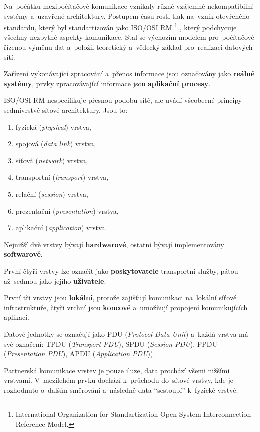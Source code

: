 Na~počátku mezipočítačové komunikace vznikaly různé vzájemně nekompatibilní systémy a~uzavřené architektury. Postupem času rostl tlak na~vznik otevřeného standardu, který byl standartizován jako ISO/OSI RM%
\footnote{International Organization for Standartization Open System Interconnection Reference Model.}%
, který podchycuje všechny nezbytné aspekty komunikace. Stal se výchozím modelem pro~počítačově řízenou výměnu dat a~položil teoretický a~vědecký základ pro~realizaci datových sítí.

Zařízení vykonávající zpracování a~přenos informace jsou označovány jako \textbf{reálné systémy}, prvky zpracovávající informace jsou \textbf{aplikační procesy}.

ISO/OSI RM nespecifikuje přesnou podobu sítě, ale uvádí všeobecné principy sedmivrstvé síťové architektury. Jsou to:

\begin{enumerate}
	\item fyzická (\emph{physical}) vrstva,
	\item spojová (\emph{data link}) vrstva,
	\item síťová (\emph{network}) vrstva,
	\item transportní (\emph{transport}) vrstva,
	\item relační (\emph{session}) vrstva,
	\item prezentační (\emph{presentation}) vrstva,
	\item aplikační (\emph{application}) vrstva.
\end{enumerate}

Nejnižší dvě vrstvy bývají \textbf{hardwarové}, ostatní bývají implementovány \textbf{softwarově}.

První čtyři vrstvy lze označit jako \textbf{poskytovatele} transportní služby, pátou až~sedmou jako jejího \textbf{uživatele}.

První tři vrstvy jsou \textbf{lokální}, protože zajišťují komunikaci na~lokální síťové infrastruktuře, čtyři vrchní jsou \textbf{koncové} a~umožňují propojení komunikujících aplikací.

Datové jednotky se označují jako PDU (\emph{Protocol Data Unit}) a~každá vrstva má své označení: TPDU (\emph{Transport PDU}), SPDU (\emph{Session PDU}), PPDU (\emph{Presentation PDU}), APDU (\emph{Application PDU})).

Partnerská komunikace vrstev je pouze iluze, data prochází všemi nižšími vrstvami. V~mezilehém prvku dochází k~průchodu do~síťové vrstvy, kde je rozhodnuto o~dalším směrování a~následně data \enquote{sestoupí} k~fyzické vrstvě.

